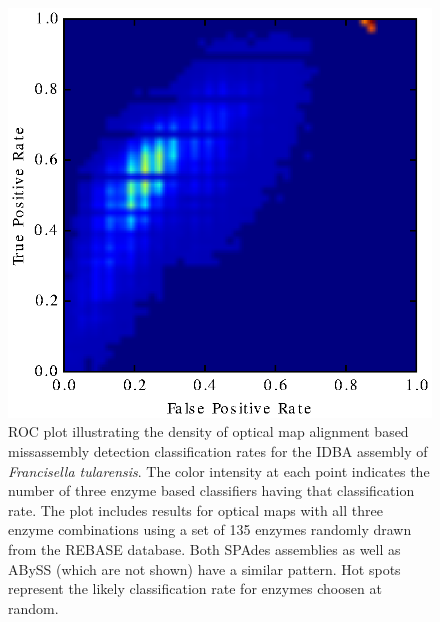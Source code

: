         \begin{figure}[h!]
            \centering
              	\includegraphics[scale=.9]{./idba.eps}
                	\caption{ROC plot illustrating the density of optical map alignment based missassembly detection classification rates for the IDBA assembly of {\em Francisella tularensis}. The color intensity at each point indicates the number of three enzyme based classifiers having that classification rate. The plot includes results for optical maps with all three enzyme combinations using a set of 135 enzymes randomly drawn from the REBASE database.  Both SPAdes assemblies as well as ABySS (which are not shown) have a similar pattern. Hot spots represent the likely classification rate for enzymes choosen at random.}
                	\label{fig:idba_roc}
        \end{figure}

